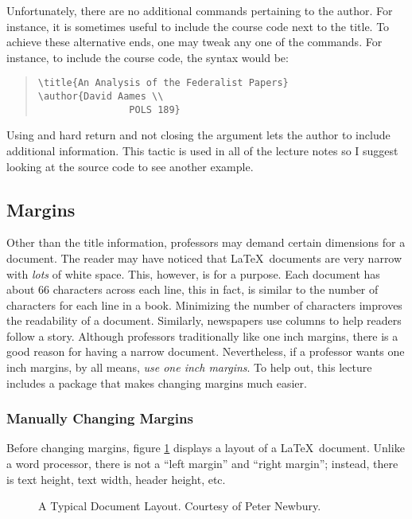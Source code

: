 \documentclass{article}
\begin{document}
Unfortunately, there are no additional commands pertaining to the author. For instance, it is sometimes useful to include the course code next to the title. To achieve these alternative ends, one may tweak any one of the commands. For instance, to include the course code, the syntax would be:
\begin{quote}
\begin{verbatim}
\title{An Analysis of the Federalist Papers}
\author{David Aames \\
				POLS 189}
\end{verbatim}
\end{quote}
Using and hard return and not closing the argument lets the author to include additional information. This tactic is used in all of the lecture notes so I suggest looking at the source code to see another example.

\subsection{Margins}

Other than the title information, professors may demand certain dimensions for a document. The reader may have noticed that \LaTeX\ documents are very narrow with \emph{lots} of white space. This, however, is for a purpose. Each document has about 66 characters across each line, this in fact, is similar to the number of characters for each line in a book. Minimizing the number of characters improves the readability of a document. Similarly, newspapers use columns to help readers follow a story. Although professors traditionally like one inch margins, there is a good reason for having a narrow document. Nevertheless, if a professor wants one inch margins, by all means, \emph{use one inch margins}. To help out, this lecture includes a package that makes changing margins much easier.

\subsubsection{Manually Changing Margins}

Before changing margins, figure \ref{img:margin} displays a layout of a \LaTeX\ document. Unlike a word processor, there is not a ``left margin'' and ``right margin''; instead, there is text height, text width, header height, etc. 

\begin{figure}[!hb]
\caption{A Typical Document Layout. Courtesy of Peter Newbury.}
\begin{center}
\end{center}
\label{img:margin}
\end{figure}
\end{document}
